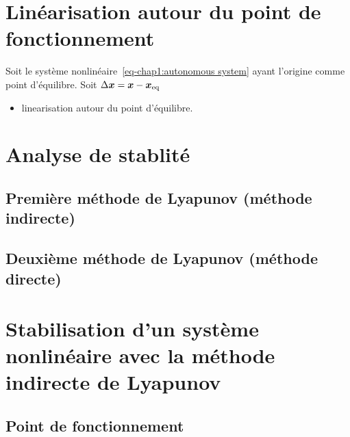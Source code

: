 \section{Linéarisation autour du point de fonctionnement}
Soit le système nonlinéaire~\eqref{eq-chap1:autonomous system} ayant l'origine comme point d'équilibre. Soit $\Delta \bm{x} = \bm{x}-\bm{x}_{\rm eq}$
\begin{itemize}
	\item linearisation autour du point d'équilibre.
\end{itemize}

\section{Analyse de stablité}\label{sec:stability analysis}
\subsection{Première méthode de Lyapunov (méthode indirecte)}
\subsection{Deuxième méthode de Lyapunov (méthode directe)}
\section{Stabilisation d'un système nonlinéaire avec la méthode indirecte de Lyapunov}
\subsection{Point de fonctionnement}